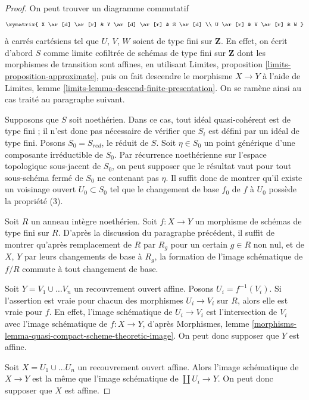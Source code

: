 \begin{proof}
On peut trouver un diagramme commutatif
$$
\xymatrix{
X \ar[d] \ar[r] & Y \ar[d] \ar[r] & S \ar[d] \\
U \ar[r] & V \ar[r] & W
}
$$
à carrés cartésiens tel que $U$, $V$, $W$
soient de type fini sur $\mathbf{Z}$. En effet, on écrit d'abord $S$
comme limite cofiltrée de schémas de type fini sur $\mathbf{Z}$
dont les morphismes de transition sont affines,
en utilisant Limites, proposition \ref{limits-proposition-approximate},
puis on fait descendre le morphisme $X \to Y$ à l'aide de
Limites, lemme \ref{limits-lemma-descend-finite-presentation}.
On se ramène ainsi au cas traité au paragraphe suivant.

\medskip\noindent
Supposons que $S$ soit noethérien.  Dans ce cas, tout idéal quasi-cohérent
est de type fini ; il n'est donc pas nécessaire de vérifier que
$S_i$ est défini par un idéal de type fini. Posons $S_0 = S_{red}$, le
réduit de $S$. Soit $\eta \in S_0$ un point générique
d'une composante irréductible de $S_0$. Par récurrence noethérienne sur
l'espace topologique sous-jacent de $S_0$, on peut supposer que le résultat
vaut pour tout sous-schéma fermé de $S_0$ ne contenant pas $\eta$.
Il suffit donc de montrer qu'il existe un voisinage ouvert
$U_0 \subset S_0$ tel que le changement de base $f_0$ de $f$ à $U_0$
possède la propriété (3).

\medskip\noindent
Soit $R$ un anneau intègre noethérien. Soit $f : X \to Y$ un morphisme
de schémas de type fini sur $R$. D'après la discussion du paragraphe précédent,
il suffit de montrer qu'après remplacement de $R$ par $R_g$ pour un certain $g \in R$
non nul, et de $X$, $Y$ par leurs changements de base à $R_g$,
la formation de l'image schématique de $f/R$ commute
à tout changement de base.

\medskip\noindent
Soit $Y = V_1 \cup \ldots V_n$ un recouvrement ouvert affine.
Posons $U_i = f^{-1}(V_i)$. Si l'assertion est vraie pour chacun des
morphismes $U_i \to V_i$ sur $R$, alors elle est vraie pour $f$.
En effet, l'image schématique de $U_i \to V_i$
est l'intersection de $V_i$ avec l'image schématique de
$f : X \to Y$, d'après Morphismes, lemme
\ref{morphisms-lemma-quasi-compact-scheme-theoretic-image}.
On peut donc supposer que $Y$ est affine.

\medskip\noindent
Soit $X = U_1 \cup \ldots U_n$ un recouvrement ouvert affine.
Alors l'image schématique de $X \to Y$ est la même que
l'image schématique de $\coprod U_i \to Y$.
On peut donc supposer que $X$ est affine.


\end{proof}
